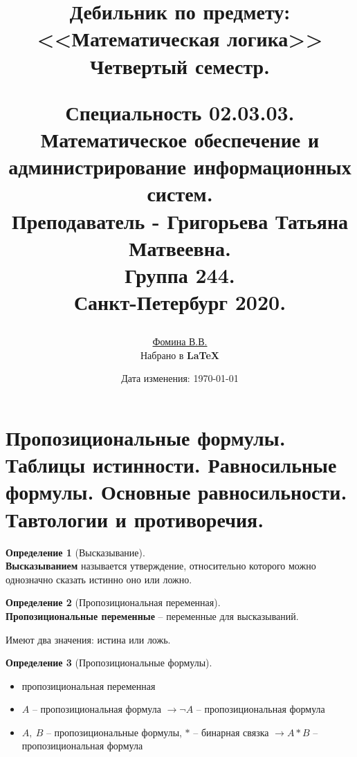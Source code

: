 \documentclass[a4paper,12pt]{article}
\author{
	\href{https://vk.com/victoriaisthebestgirl}{Фомина В.В.}\\ 
	Набрано в {\bf\LaTeX}
}
\title{
	Дебильник по предмету:\\
	 <<Математическая логика>>\\
	Четвертый семестр.
	\begin{center}
		\normalsize
		Специальность 02.03.03.\\
		Математическое обеспечение и администрирование информационных систем.\\
		Преподаватель - Григорьева Татьяна Матвеевна.\\
		Группа 244.\\
		Санкт-Петербург 2020.
	\end{center}
}
\date{Дата изменения: \today\quad\currenttime}
\theoremstyle{definition} %
\newtheorem{definition}{Определение}[section]
\theoremstyle{definition} %
\theoremstyle{remark} %
\begin{document}
	
\maketitle
\newpage

\tableofcontents

\newpage

\section{Пропозициональные формулы. Таблицы истинности. Равносильные формулы. Основные равносильности. Тавтологии и противоречия.}
	\begin{definition}[Высказывание]\ \\[1ex]
		\textbf{Высказыванием} называется утверждение, относительно которого можно однозначно сказать истинно оно или ложно.\\[1ex]
	\end{definition}

	\begin{definition}[Пропозициональная переменная]\ \\[1ex]
		\textbf{Пропозициональные переменные} -- переменные для высказываний.
	\end{definition}
	Имеют два значения: истина или ложь.\\[1ex]

	\begin{definition}[Пропозициональные формулы]\
		\begin{itemize}
			\item пропозициональная переменная
			\item $A$ -- пропозициональная формула $\rightarrow \neg A$ -- пропозициональная формула
			\item $A, \ B$ -- пропозициональные формулы, $*$ -- бинарная связка $\rightarrow A * B$ -- пропозициональная формула
		\end{itemize}		
	\end{definition}
\end{document}

